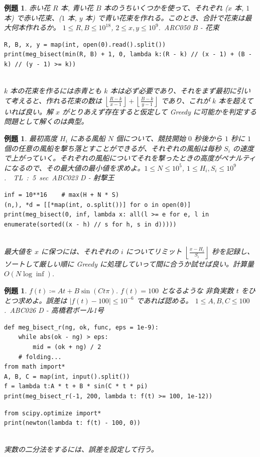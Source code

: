 \documentclass[12pt, a4j]{ltjsarticle}
\newtheorem{exm}[thm]{例題}
\begin{document}
\begin{exm}\upshape 赤い花 $R$ 本, 青い花 $B$ 本のうちいくつかを使って、それぞれ ($x$ 本, $1$ 本) で赤い花束、($1$ 本, $y$ 本) で青い花束を作れる。このとき、合計で花束は最大何本作れるか。 $1 \le R, B \le 10^{18}$, $2 \le x, y \leq 10^9$.\  ARC050 B - 花束\\
\begin{lstlisting}
R, B, x, y = map(int, open(0).read().split())
print(meg_bisect(min(R, B) + 1, 0, lambda k:(R - k) // (x - 1) + (B - k) // (y - 1) >= k))
\end{lstlisting}\quad\\
$k$ 本の花束を作るには赤青とも $k$ 本は必ず必要であり、それをまず最初に引いて考えると、作れる花束の数は $\left\lfloor\frac{R-k}{x-1}\right\rfloor + \left\lfloor\frac{B-k}{y-1}\right\rfloor$ であり、これが $k$ 本を超えていれば良い。解 $x$ がとりあえず存在すると仮定して Greedy に可能かを判定する問題として解くのは典型。
\end{exm}

\vspace{1cm}

\begin{exm}\upshape 最初高度 $H_i$ にある風船 $N$ 個について、競技開始 $0$ 秒後から $1$ 秒に $1$ 個の任意の風船を撃ち落とすことができるが、それぞれの風船は毎秒 $S_i$ の速度で上がっていく。それぞれの風船についてそれを撃ったときの高度がペナルティになるので、その最大値の最小値を求めよ。$1 \le N \le 10^5$, $1 \le H_i, S_i \leq 10^9$.\ \ TL\ :\ 5\ sec\ \ \  ABC023 D - 射撃王\\
\begin{lstlisting}
inf = 10**16    # max(H + N * S)
(n,), *d = [[*map(int, o.split())] for o in open(0)]
print(meg_bisect(0, inf, lambda x: all(l >= e for e, l in enumerate(sorted((x - h) // s for h, s in d)))))
\end{lstlisting}\quad\\
最大値を $x$ に保つには、それぞれの $i$ についてリミット $\left\lfloor\frac{x-H_i}{S_i}\right\rfloor$ 秒を記録し、ソートして厳しい順に Greedy に処理していって間に合うか試せば良い。計算量 $O(N\log\inf)$.
\end{exm}

\vspace{1cm}

\begin{exm}\upshape $f(t) \coloneqq At + B\sin(Ct\pi)$. $f(t)=100$ となるような 非負実数 $t$ をひとつ求めよ。誤差は $|f(t)-100|\le10^{-6}$ であれば認める。 $1 \le A,B,C \le 100$.\ ABC026 D - 高橋君ボール1号\\
\begin{lstlisting}
def meg_bisect_r(ng, ok, func, eps = 1e-9):
    while abs(ok - ng) > eps:
        mid = (ok + ng) / 2
    # folding...
from math import*
A, B, C = map(int, input().split())
f = lambda t:A * t + B * sin(C * t * pi)
print(meg_bisect_r(-1, 200, lambda t: f(t) >= 100, 1e-12))
\end{lstlisting}
\begin{lstlisting}
from scipy.optimize import*
print(newton(lambda t: f(t) - 100, 0))
\end{lstlisting}\quad\\
実数の二分法をするには、誤差を設定して行う。
\end{exm}
\end{document}

